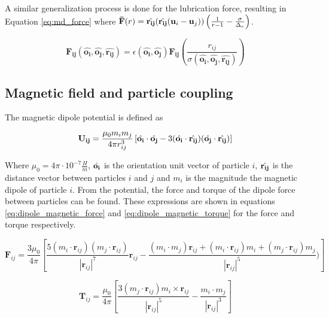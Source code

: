 A similar generalization process is done for the lubrication force, resulting in Equation \ref{eq:md_force} where $\mathbf{\Bar{F}}(r) = \hat{\mathbf{r_{ij}}}(\hat{\mathbf{r_{ij}}}(\mathbf{u}_i - \mathbf{u}_j))\left( \frac{1}{r - 1} - \frac{\sigma}{\Delta_{c}} \right)$. 

\begin{equation}
    \mathbf{F_{ij}}(\hat{\mathbf{o_i}}, \hat{\mathbf{o_j}}, \hat{\mathbf{r_{ij}}}) = \epsilon(\hat{\mathbf{o_i}}, \hat{\mathbf{o_j}})\mathbf{\mathbf{F_{ij}}}\left( \frac{r_{ij}}{\sigma(\hat{\mathbf{o_i}}, \hat{\mathbf{o_j}}, \hat{\mathbf{r_{ij}}})} \right)
    \label{eq:md_force}
\end{equation}

\subsection{Magnetic field and particle coupling}

The magnetic dipole potential is defined as

\begin{equation}
    \mathbf{U_{ij}} = \frac{\mu_0 m_i m_j}{4\pi r_{ij}^{3}} \left[ \Hat{\mathbf{o_i}} \cdot \Hat{\mathbf{o_j}} - 3(\Hat{\mathbf{o_i}} \cdot \Hat{\mathbf{r_{ij}}})(\Hat{\mathbf{o_j}} \cdot \Hat{\mathbf{r_{ij}}}) \right]
    \label{eq:magnet_potential}
\end{equation}

Where $\mu_0 = 4\pi \cdot 10^{-7} \frac{H}{m}$,  $\Hat{\mathbf{o_i}}$ is the orientation unit vector of particle $i$, $\Hat{\mathbf{r_{ij}}}$ is the distance vector between particles $i$ and $j$ and $m_i$ is the magnitude the magnetic dipole of particle $i$. From the potential, the force and torque of the dipole force between particles can be found. These expressions are shown in equations \ref{eq:dipole_magnetic_force} and \ref{eq:dipole_magnetic_torque} for the force and torque respectively.

\begin{equation}
    \mathbf{F}_{ij} = \frac{3 \mu_0}{4 \pi} [\frac{5(m_i \cdot \mathbf{r}_{ij})(m_j \cdot \mathbf{r}_{ij})}{|\mathbf{r}_{ij}|^7}\mathbf{r}_{ij} - \frac{(m_i \cdot m_{j})\mathbf{r}_{ij} + (m_i \cdot \mathbf{r}_{ij})m_i + (m_j \cdot \mathbf{r}_{ij})m_j }{|\mathbf{r}_{ij}|^5})]
\label{eq:dipole_magnetic_force}
\end{equation}

\begin{equation}
    \mathbf{T}_{ij} = \frac{\mu_0}{4 \pi}[ \frac{3(m_j \cdot \mathbf{r}_{ij})m_i \times \mathbf{r}_{ij} }{|\mathbf{r}_{ij}|^5} - \frac{m_i \cdot m_j }{|\mathbf{r}_{ij}|^3} ]
    \label{eq:dipole_magnetic_torque}
\end{equation}

